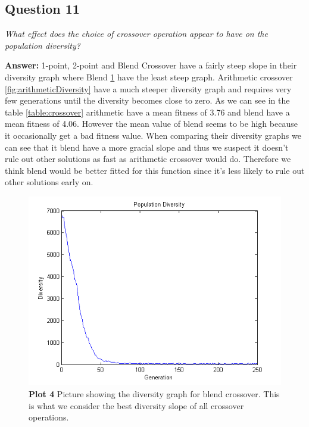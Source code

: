 \documentclass[a4paper]{article}
\begin{document}
\subsection*{Question 11}
\emph{What effect does the choice of crossover operation appear to
have on the population diversity?}

\textbf{Answer:} 1-point, 2-point and Blend Crossover have a fairly steep slope in their diversity graph where Blend \ref{fig:blendDiversity} have the least steep graph. Arithmetic crossover \ref{fig:arithmeticDiversity} have a much steeper diversity graph and requires very few generations until the diversity becomes close to zero. As we can see in the table \ref{table:crossover} arithmetic have a mean fitness of 3.76 and blend have a mean fitness of 4.06. However the mean value of blend seems to be high because it occasionally get a bad fitness value. When comparing their diversity graphs we can see that it blend have a more gracial slope and thus we suspect it doesn't rule out other solutions as fast as arithmetic crossover would do. Therefore we think blend would be better fitted for this function since it's less likely to rule out other solutions early on.
 
 \begin{figure}[H] %
	 \includegraphics[scale=0.8]{BlendDiversity.png}
	 \caption{\label{fig:blendDiversity}\textbf{Plot 4} Picture showing the diversity graph for blend crossover. This is what we consider the best diversity slope of all crossover operations.}
 \end{figure}
 
\end{document}
